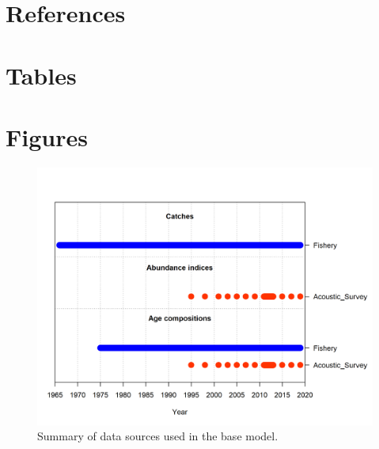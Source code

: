 \documentclass[11pt,
  english,
  a4paper,
]{article}
\begin{document}
\leavevmode\tagmcend\tagstructend\par

\clearpage


\hypertarget{references}{%
\section{References}\label{references}}

\leavevmode\tagmcend\tagstructend


\hypertarget{refs}{}

\leavevmode\tagmcend\tagstructend

\clearpage


\hypertarget{tables}{%
\section{Tables}\label{tables}}

\leavevmode\tagmcend\tagstructend

\clearpage


\hypertarget{figures}{%
\section{Figures}\label{figures}}

\leavevmode\tagmcend\tagstructend


\begin{figure}
\centering
\includegraphics[width=1\textwidth,height=1\textheight]{data-plot.png}
\caption{Summary of data sources used in the base model.\label{fig:data-plot}}
\end{figure}
\end{document}
